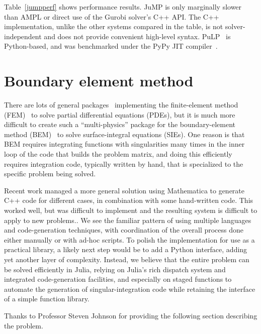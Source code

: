 Table~\ref{jumpperf} shows performance results.
JuMP is only marginally slower than AMPL or direct use of the Gurobi solver's
C++ API.
The C++ implementation, unlike the other systems compared in the table,
is not solver-independent and does not provide convenient high-level syntax.
PuLP~\cite{mitchell2011pulp} is Python-based, and was benchmarked under the
PyPy JIT compiler~\cite{pypyjit}.


\section{Boundary element method}
\label{sec:BEM}

There are lots of general
packages~\cite{LoggOlgaardEtAl2012a,Rathgeber2015} implementing the
finite-element method (FEM)~\cite{Zienkiewicz13} to solve partial
differential equations (PDEs), but it is much more difficult to create
such a ``multi-physics'' package for the boundary-element method
(BEM)~\cite{Bonnet99,Chew09} to solve surface-integral equations
(SIEs).  One reason is that BEM requires integrating functions with singularities
many times in the inner loop of the code that builds the problem matrix, and
doing this efficiently requires integration code, typically written by hand, that is specialized to
the specific problem being solved.

Recent work \cite{ReidWhJo14} managed a more general solution
using Mathematica to generate C++ code for different cases, in combination with some hand-written code.
This worked well, but was difficult to implement and the resulting system
is difficult to apply to new problems..
We see the familiar pattern of using multiple languages and
code-generation techniques, with coordination of the overall process done
either manually or with ad-hoc scripts.
To polish the implementation for use as a practical library, a likely next
step would be to add a Python interface, adding yet another layer of complexity.
Instead, we believe that the entire problem can be solved efficiently in Julia,
relying on Julia's rich dispatch system and integrated code-generation facilities,
and especially on staged functions to automate the generation of singular-integration
code while retaining the interface of a simple function library.



Thanks to Professor Steven Johnson for providing the following section describing
the problem.

